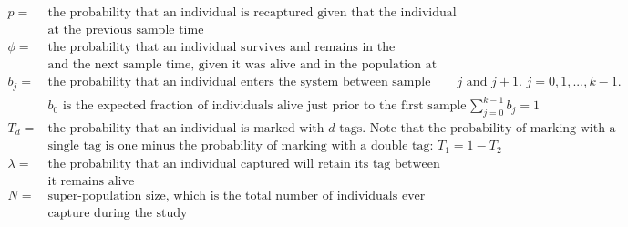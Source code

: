 \documentclass[]{article}
\begin{document}
\[
  \begin{array}{ll}
      p= & \text{the probability that an individual is recaptured given that the individual was alive}\\
      & \text{at the previous sample time} \\
      \phi=  & \text{the probability that an individual survives and remains in the population between a sample times }\\
      & \text{and the next sample time, given it was alive and in the population at the previous sample time }\\
      b_j= & \text{the probability that an individual enters the system between sample times $j$ and $j+1$. $j=0,1,...,k-1$.}\\
       & \text{$b_0$ is the expected fraction of individuals alive just prior to the first sample time, with $\sum_{j=0}^{k-1} b_j=1$}\\
      
      T_d= & \text{the probability that an individual is marked with $d$ tags. Note that the probability of marking with a }\\
      & \text{single tag is one minus the probability of marking with a double tag: $T_1=1-T_2$}\\
      \lambda= & \text{the probability that an individual captured will  retain its tag between sample times  given that}\\
      & \text{it remains alive}\\
      N= & \text{super-population size, which is the total number of individuals ever present in population and available for}\\
      & \text{capture during the study}\\
  \end{array}
\]
\end{document}
